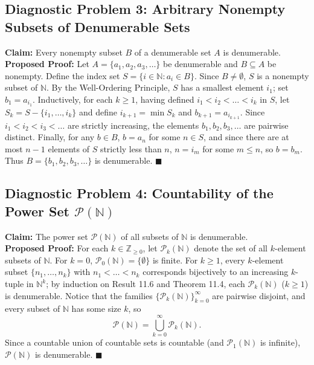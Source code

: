 \documentclass[11pt, letterpaper]{article}
\theoremstyle{definition}
\theoremstyle{remark}
\begin{document}
\subsection{Diagnostic Problem 3: Arbitrary Nonempty Subsets of Denumerable Sets}
\textbf{Claim:} Every nonempty subset $B$ of a denumerable set $A$ is denumerable.\\
\textbf{Proposed Proof:} Let $A = \{a_1, a_2, a_3, \dots\}$ be denumerable and $B \subseteq A$ be nonempty. Define the index set $S = \{i \in \mathbb{N} : a_i \in B\}$. Since $B \neq \emptyset$, $S$ is a nonempty subset of $\mathbb{N}$. By the Well-Ordering Principle, $S$ has a smallest element $i_1$; set $b_1 = a_{i_1}$. Inductively, for each $k \geq 1$, having defined $i_1 < i_2 < \dots < i_k$ in $S$, let $S_k = S - \{i_1, \dots, i_k\}$ and define $i_{k+1} = \min S_k$ and $b_{k+1} = a_{i_{k+1}}$. Since $i_1 < i_2 < i_3 < \dots$ are strictly increasing, the elements $b_1, b_2, b_3, \dots$ are pairwise distinct. Finally, for any $b \in B$, $b = a_n$ for some $n \in S$, and since there are at most $n - 1$ elements of $S$ strictly less than $n$, $n = i_m$ for some $m \leq n$, so $b = b_m$. Thus $B = \{b_1, b_2, b_3, \dots\}$ is denumerable. $\blacksquare$

\subsection{Diagnostic Problem 4: Countability of the Power Set $\mathcal{P}(\mathbb{N})$}
\textbf{Claim:} The power set $\mathcal{P}(\mathbb{N})$ of all subsets of $\mathbb{N}$ is denumerable.\\
\textbf{Proposed Proof:} For each $k \in \mathbb{Z}_{\geq 0}$, let $\mathcal{P}_k(\mathbb{N})$ denote the set of all $k$-element subsets of $\mathbb{N}$. For $k = 0$, $\mathcal{P}_0(\mathbb{N}) = \{\emptyset\}$ is finite. For $k \geq 1$, every $k$-element subset $\{n_1, \dots, n_k\}$ with $n_1 < \dots < n_k$ corresponds bijectively to an increasing $k$-tuple in $\mathbb{N}^k$; by induction on Result 11.6 and Theorem 11.4, each $\mathcal{P}_k(\mathbb{N})$ ($k \geq 1$) is denumerable. Notice that the families $\{\mathcal{P}_k(\mathbb{N})\}_{k=0}^\infty$ are pairwise disjoint, and every subset of $\mathbb{N}$ has some size $k$, so
\[
\mathcal{P}(\mathbb{N}) = \bigcup_{k=0}^\infty \mathcal{P}_k(\mathbb{N}).
\]
Since a countable union of countable sets is countable (and $\mathcal{P}_1(\mathbb{N})$ is infinite), $\mathcal{P}(\mathbb{N})$ is denumerable. $\blacksquare$
\end{document}
